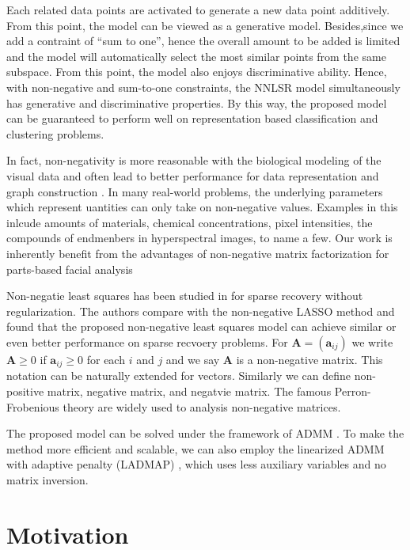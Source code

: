 \documentclass[10pt,twocolumn,letterpaper]{article}
\begin{document}
Each related data points are activated to generate a new data point additively. From this point, the model can be viewed as a generative model. Besides,since we add a contraint of ``sum to one'', hence the overall amount to be added is limited and the model will automatically select the most similar points from the same subspace. From this point, the model also enjoys discriminative ability. Hence, with non-negative and sum-to-one constraints, the NNLSR model simultaneously has generative and discriminative properties. By this way, the proposed model can be guaranteed to perform well on representation based classification and clustering problems.


In fact, non-negativity is more reasonable with the biological modeling of the visual data and often lead to better performance for data representation \cite{} and graph construction \cite{}. In many real-world problems, the underlying parameters which represent uantities can only take on non-negative values. Examples in this inlcude amounts of materials, chemical concentrations, pixel intensities, the compounds of endmenbers in hyperspectral images, to name a few. Our work is inherently benefit from the advantages of non-negative matrix factorization for parts-based facial analysis \cite{nmfnature}
 
Non-negatie least squares has been studied in \cite{slawski2013non} for sparse recovery without regularization. The authors compare with the non-negative LASSO method \cite{kim2007interior} and found that the proposed non-negative least squares model can achieve similar or even better performance on sparse recvoery problems. For $\bm{A}=(\bm{a}_{ij})$ we write $\bm{A}\ge0$ if $\bm{a}_{ij}\ge0$ for each $i$ and $j$ and we say $\bm{A}$ is a non-negative matrix. This notation can be naturally extended for vectors. Similarly we can define non-positive matrix, negative matrix, and negatvie matrix. The famous Perron-Frobenious theory are widely used to analysis non-negative matrices.

The proposed model can be solved under the framework of ADMM \cite{admm}. To make the method more efficient and scalable, we can also employ the linearized ADMM with adaptive penalty (LADMAP) \cite{ladmap}, which uses less auxiliary variables and no matrix inversion.


\section{Motivation}
\end{document}
